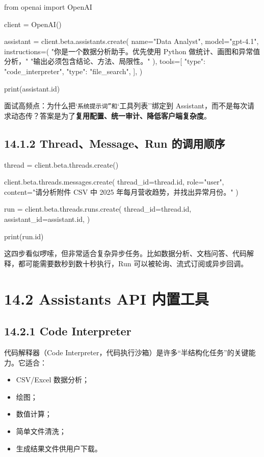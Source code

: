 \begin{codeblock}
from openai import OpenAI

client = OpenAI()

assistant = client.beta.assistants.create(
    name="Data Analyst",
    model="gpt-4.1",
    instructions=(
        "你是一个数据分析助手。优先使用 Python 做统计、画图和异常值分析，"
        "输出必须包含结论、方法、局限性。"
    ),
    tools=[
        {"type": "code_interpreter"},
        {"type": "file_search"},
    ],
)

print(assistant.id)
\end{codeblock}

面试高频点：为什么把`\texttt{系统提示词''和}`工具列表''绑定到 Assistant，而不是每次请求动态传？答案是为了\textbf{复用配置、统一审计、降低客户端复杂度}。


\subsection{14.1.2 Thread、Message、Run 的调用顺序}

\begin{codeblock}
thread = client.beta.threads.create()

client.beta.threads.messages.create(
    thread_id=thread.id,
    role="user",
    content="请分析附件 CSV 中 2025 年每月营收趋势，并找出异常月份。"
)

run = client.beta.threads.runs.create(
    thread_id=thread.id,
    assistant_id=assistant.id,
)

print(run.id)
\end{codeblock}

这四步看似啰嗦，但非常适合复杂异步任务。比如数据分析、文档问答、代码解释，都可能需要数秒到数十秒执行，Run 可以被轮询、流式订阅或异步回调。


\section{14.2 Assistants API 内置工具}

\subsection{14.2.1 Code Interpreter}

代码解释器（Code Interpreter，代码执行沙箱）是许多``半结构化任务''的关键能力。它适合：


\begin{itemize}[leftmargin=2em]
\item CSV/Excel 数据分析；
\item 绘图；
\item 数值计算；
\item 简单文件清洗；
\item 生成结果文件供用户下载。
\end{itemize}

